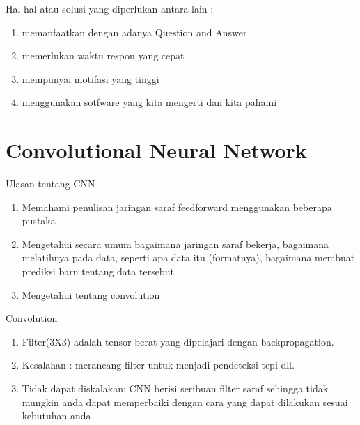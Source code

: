 Hal-hal atau solusi yang diperlukan antara lain :
\begin{enumerate}
\item memanfaatkan dengan adanya Question and Answer  
\item memerlukan waktu respon yang cepat
\item mempunyai motifasi yang tinggi
\item menggunakan sotfware yang kita mengerti dan kita pahami 
\end {enumerate}


\section{Convolutional Neural Network}
Ulasan tentang CNN
\begin{enumerate}

\item Memahami penulisan jaringan saraf feedforward menggunakan beberapa pustaka
\item Mengetahui secara umum bagaimana jaringan saraf bekerja, bagaimana melatihnya pada data, seperti apa data itu (formatnya), bagaimana membuat prediksi baru tentang data tersebut.
\item Mengetahui tentang convolution
\end{enumerate}

Convolution
\begin{enumerate}
\item Filter(3X3) adalah tensor berat yang dipelajari dengan backpropagation.
\item Kesalahan : merancang filter untuk menjadi pendeteksi tepi dll.
\item Tidak dapat diskalakan: CNN berisi seribuan filter saraf sehingga tidak mungkin anda dapat memperbaiki dengan cara yang dapat dilakukan sesuai kebutuhan anda
\end{enumerate}

